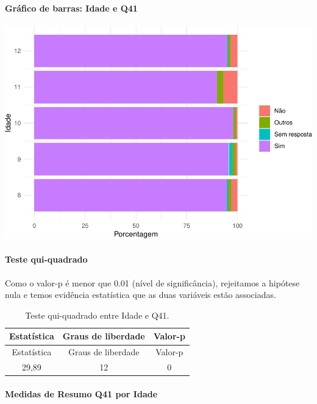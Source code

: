 \documentclass[]{article}
\let\oldparagraph\paragraph
\renewcommand{\paragraph}[1]{\oldparagraph{#1}\mbox{}}
\begin{document}
\hypertarget{gruxe1fico-de-barras-idade-e-q41}{%
\paragraph{Gráfico de barras: Idade e Q41}\label{gruxe1fico-de-barras-idade-e-q41}}

\begin{center}\includegraphics[width=0.75\linewidth]{relatorio_covid19_files/figure-latex/unnamed-chunk-1626-1} \end{center}

\hypertarget{teste-qui-quadrado-139}{%
\paragraph{Teste qui-quadrado}\label{teste-qui-quadrado-139}}

Como o valor-p é menor que 0.01 (nível de significância), rejeitamos a hipótese nula e temos evidência estatística que as duas variáveis estão associadas.

\begin{longtable}[]{@{}ccc@{}}
\caption{\label{tab:unnamed-chunk-1628}Teste qui-quadrado entre Idade e Q41.}\tabularnewline
\toprule
Estatística & Graus de liberdade & Valor-p\tabularnewline
\midrule
\endfirsthead
\toprule
Estatística & Graus de liberdade & Valor-p\tabularnewline
\midrule
\endhead
29,89 & 12 & 0\tabularnewline
\bottomrule
\end{longtable}

\cleardoublepage

\hypertarget{medidas-de-resumo-q41-por-idade}{%
\paragraph{Medidas de Resumo Q41 por Idade}\label{medidas-de-resumo-q41-por-idade}}
\end{document}
